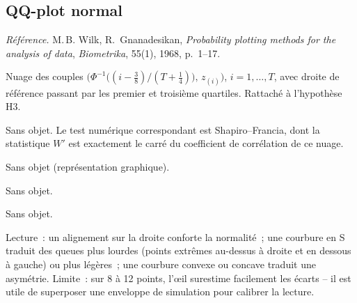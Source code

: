 \documentclass[a4paper,11pt]{article}
\newcommand{\refl}[1]{{\small\textcolor{maincolor!70!black}{\textit{Référence.} #1}}\par\smallskip}
\newcounter{ficheid}
\newenvironment{fiche}[1]{%
  \stepcounter{ficheid}%
  \phantomsection
  \subsection{#1}%
  \label{fiche:\theficheid}%
}{%
  \end{description}\vspace{0.5em}%
}
\newcommand{\Cadre}{%
  \begin{description}[leftmargin=0pt, style=unboxed, itemsep=3pt, topsep=3pt, parsep=2pt]%
  \item[\textcolor{financeblue}{\textbf{1. Cadre, notations et hypothèses de validité (non testées).}}]}
\newcommand{\Hzero}{\item[\textcolor{financeblue}{\textbf{2. Hypothèse nulle.}}]}
\newcommand{\Stat}{\item[\textcolor{financeblue}{\textbf{3. Statistique de test.}}]}
\newcommand{\Loi}{\item[\textcolor{financeblue}{\textbf{4. Loi sous $H_0$.}}]}
\newcommand{\Pval}{\item[\textcolor{financeblue}{\textbf{5. p-value.}}]}
\newcommand{\Usage}{\item[\textcolor{financeblue}{\textbf{6. Usage et limites.}}]}
\begin{document}
\begin{fiche}{QQ-plot normal}\label{fiche:qqnorm}
\refl{M.\,B. Wilk, R.~Gnanadesikan, \emph{Probability plotting methods for the analysis of data},
\emph{Biometrika}, 55(1), 1968, p.~1--17.}
\Cadre
Nuage des couples $\big(\Phi^{-1}\!\big((i-\tfrac38)/(T+\tfrac14)\big),\, z_{(i)}\big)$,
$i=1,\dots,T$, avec droite de référence passant par les premier et troisième quartiles. Rattaché
à l'hypothèse H3.
\Hzero
Sans objet. Le test numérique correspondant est Shapiro--Francia, dont la statistique $W'$ est
exactement le carré du coefficient de corrélation de ce nuage.
\Stat
Sans objet (représentation graphique).
\Loi
Sans objet.
\Pval
Sans objet.
\Usage
Lecture~: un alignement sur la droite conforte la normalité~; une courbure en S traduit des queues
plus lourdes (points extrêmes au-dessus à droite et en dessous à gauche) ou plus légères~; une
courbure convexe ou concave traduit une asymétrie. Limite~: sur 8 à 12 points, l'œil surestime
facilement les écarts -- il est utile de superposer une enveloppe de simulation pour calibrer la
lecture.


\end{fiche}
\end{document}
